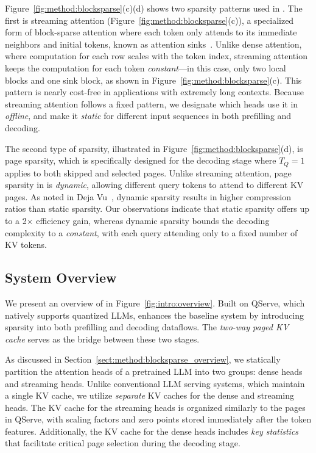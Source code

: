 Figure~\ref{fig:method:blocksparse}(c)(d) shows two sparsity patterns used in \system. The first is streaming attention (Figure~\ref{fig:method:blocksparse}(c)), a specialized form of block-sparse attention where each token only attends to its immediate neighbors and initial tokens, known as attention sinks~\cite{xiao2023efficient}. Unlike dense attention, where computation for each row scales with the token index, streaming attention keeps the computation for each token \textit{constant}—in this case, only two local blocks and one sink block, as shown in Figure~\ref{fig:method:blocksparse}(c). This pattern is nearly cost-free in applications with extremely long contexts. Because streaming attention follows a fixed pattern, we designate which heads use it in \textit{offline}, and make it \textit{static} for different input sequences in both prefilling and decoding.

The second type of sparsity, illustrated in Figure~\ref{fig:method:blocksparse}(d), is page sparsity, which is specifically designed for the decoding stage where $T_Q=1$ applies to both skipped and selected pages. Unlike streaming attention, page sparsity in \system is \textit{dynamic}, allowing different query tokens to attend to different KV pages. As noted in Deja Vu~\cite{liu2023deja}, dynamic sparsity results in higher compression ratios than static sparsity. Our observations indicate that static sparsity offers up to a 2$\times$ efficiency gain, whereas dynamic sparsity bounds the decoding complexity to a \textit{constant}, with each query attending only to a fixed number of KV tokens.

\subsection{\system System Overview}
\vspace{2pt}

We present an overview of \system in Figure~\ref{fig:intro:overview}. Built on QServe, which natively supports quantized LLMs, \system enhances the baseline system by introducing sparsity into both prefilling and decoding dataflows. The \textit{two-way paged KV cache} serves as the bridge between these two stages. 

As discussed in Section~\ref{sect:method:blocksparse_overview}, we statically partition the attention heads of a pretrained LLM into two groups: dense heads and streaming heads. Unlike conventional LLM serving systems, which maintain a single KV cache, we utilize \textit{separate} KV caches for the dense and streaming heads. The KV cache for the streaming heads is organized similarly to the pages in QServe, with scaling factors and zero points stored immediately after the token features. Additionally, the KV cache for the dense heads includes \textit{key statistics} that facilitate critical page selection during the decoding stage.

